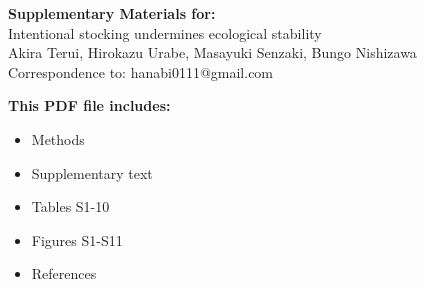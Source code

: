 \begin{center}
\LARGE{\textbf{Supplementary Materials for:}}\\[7.5mm]
\LARGE{Intentional stocking undermines ecological stability}\\[7.5mm]
\large{Akira Terui, Hirokazu Urabe, Masayuki Senzaki, Bungo Nishizawa}\\[7.5mm]
\large{Correspondence to: hanabi0111@gmail.com}\\[15mm]
\end{center}
\begin{flushleft}
\textbf{This PDF file includes:}
\begin{itemize}
\item Methods
\item Supplementary text
\item Tables S1-10
\item Figures S1-S11
\item References
\end{itemize}
\end{flushleft}

\newpage
